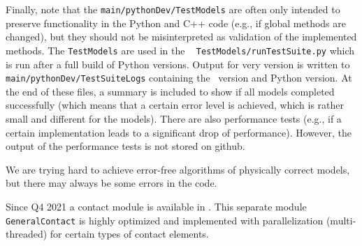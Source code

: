Finally, note that the \texttt{main/pythonDev/TestModels} are often only intended to preserve functionality
in the Python and C++ code (e.g., if global methods are changed), but they should not be misinterpreted as validation of the 
implemented methods. The \texttt{TestModels} are used in the \codeName\  \texttt{TestModels/runTestSuite.py}
which is run after a full build of Python versions. Output for very version is written
to \texttt{main/pythonDev/TestSuiteLogs} containing the \codeName\ version and Python version. At the end of these
files, a summary is included to show if all models completed successfully (which means that a certain error level is achieved, which is rather small and different for the models).
There are also performance tests (e.g., if a certain implementation leads to a significant drop of performance).
However, the output of the performance tests is not stored on github.

We are trying hard to achieve error-free algorithms of physically correct models, but there may always be some errors in the code.

%
Since Q4 2021 a contact module is available in \codeName. 
This separate module \texttt{GeneralContact} is highly optimized and implemented with parallelization (multi-threaded) for certain types of contact elements.


